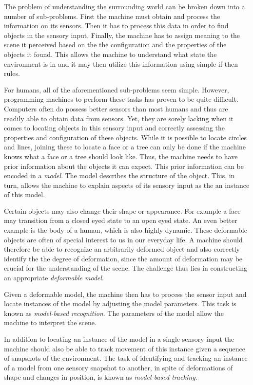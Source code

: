\documentclass[11pt,a4paper]{report}
\begin{document}
The problem of understanding the surrounding world can be broken down into a
number of sub-problems. First the machine must obtain and process the information on
its sensors. Then it has to process this data in order to find objects in the
sensory input. Finally, the machine has to assign meaning to the scene it perceived
based on the the configuration and the properties of the objects it found. This
allows the machine to understand what state the environment is in and it may
then utilize this information using simple if-then rules.

For humans, all of the aforementioned sub-problems seem simple. However, programming
machines to perform these tasks has proven to be quite difficult. Computers often do
possess better sensors than most humans and thus are readily able to obtain data
from sensors. Yet, they are sorely lacking when it comes to locating objects
in this sensory input and correctly assessing the properties and configuration
of these objects. While it is possible to locate circles and lines, joining
these to locate a face or a tree can only be done if the machine knows what a
face or a tree should look like. Thus, the machine needs to have prior
information about the objects it can expect. This prior information can be
encoded in a \textit{model}. The model describes the structure of the object.
This, in turn, allows the machine to explain aspects of its sensory input as the
an instance of this model.

Certain objects may also change their shape or
appearance. For example a face may transition from a closed eyed state to an
open eyed state. An even better example is the body of a human, which is also
highly dynamic. These deformable objects are often of special interest to us in
our everyday life. A machine should therefore be able to recognize an arbitrarily deformed
object and also correctly identify the the degree of deformation, since the amount of deformation may be crucial for the understanding of
the scene. The challenge thus lies in constructing an appropriate \textit{deformable
model}. 

Given a deformable model, the machine then has to process the sensor input and
locate instances of the model by adjusting the model parameters. This task is
known as \textit{model-based recognition}. The parameters of the model allow the
machine to interpret the scene. 

In addition to locating an instance of the model
in a single sensory input the machine should also be able to track movement of
this instance given a sequence of snapshots of
the environment. The task of identifying and tracking an instance of a model from
one sensory snapshot to another, in spite of deformations of shape
and changes in position, is known as \textit{model-based tracking}.
\end{document}
